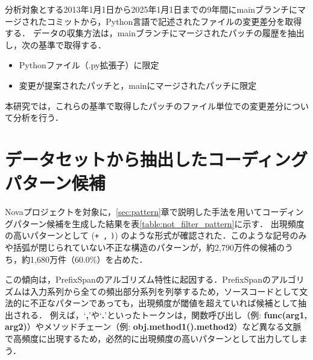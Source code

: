 \documentclass[11pt]{jreport}
\begin{document}
分析対象とする2013年1月1日から2025年1月1日までの9年間にmainブランチにマージされたコミットから，Python言語で記述されたファイルの変更差分を取得する．
データの収集方法は，mainブランチにマージされたパッチの履歴を抽出し，次の基準で取得する．
\begin{itemize}
    \item Pythonファイル（.py拡張子）に限定
    \item 変更が提案されたパッチと，mainにマージされたパッチに限定
\end{itemize}
本研究では，これらの基準で取得したパッチのファイル単位での変更差分について分析を行う．

\begin{table}[h]
    \centering
    \caption{データセットから抽出したコーディングパターン候補}
\end{table}

\section{データセットから抽出したコーディングパターン候補}\label{subsec:difficult}
Novaプロジェクトを対象に，\ref{sec:pattern}章で説明した手法を用いてコーディングパターン候補を生成した結果を表\ref{table:not_filter_pattern}に示す．
出現頻度の高いパターンとして (\colorbox{lightgray!50}{\texttt{+ ,}} \colorbox{lightgray!50}{\texttt{)}}) のような形式が確認された．このような記号のみや括弧が閉じられていない不正な構造のパターンが，約2,790万件の候補のうち，約1,680万件（60.0\%）を占めた．

この傾向は，PrefixSpanのアルゴリズム特性に起因する．PrefixSpanのアルゴリズムは入力系列から全ての頻出部分系列を列挙するため，ソースコードとして文法的に不正なパターンであっても，出現頻度が閾値を超えていれば候補として抽出される．
例えば，`\textbf{,}'や`\textbf{.}'といったトークンは，関数呼び出し（例: \textbf{func(arg1, arg2)}）やメソッドチェーン（例: \textbf{obj.method1().method2}）など異なる文脈で高頻度に出現するため，必然的に出現頻度の高いパターンとして出力してしまう．
\end{document}
